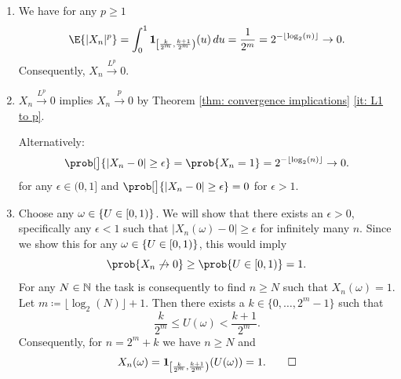 \begin{solution}
\begin{enumerate}[wide=0pt]
    \item[\ref{it: (conv in Lp but not as) in Lp}]
    We have for any \(p \ge 1\)
    \[
        \E{|X_n|^p} = \int_0^1 \ind{
            \left[\frac{k}{2^{m}}, \frac{k+1}{2^{m}} \right)
        }(u) \, du
        = \frac{1}{2^m} = 2^{-\lfloor \log_2(n) \rfloor} \to 0.
    \]
    Consequently, \(X_n \xrightarrow{L^p} 0\).

    \item[\ref{it: (conv in Lp but not as) in prob}]
    \(X_n \xrightarrow{L^p} 0\) implies \(X_n \xrightarrow{p} 0\) by Theorem
    \ref{thm: convergence implications} \ref{it: L1 to p}.

    Alternatively:
    \[
        \prob[\bigl]{|X_n - 0| \ge \epsilon}
        = \prob{X_n = 1}
        = 2^{-\lfloor \log_2(n) \rfloor} \to 0.
    \]
    for any \(\epsilon \in (0,1]\) and \(\prob[\bigl]{|X_n - 0| \ge
    \epsilon}=0\) for \(\epsilon > 1\).

    \item[\ref{it: (conv in Lp but not as) not as}]
    Choose any \(\omega \in \{U\in [0,1)\}\). We will show that there exists an
    \(\epsilon > 0\), specifically any \(\epsilon < 1\) such that
    \(|X_n(\omega) - 0| \ge \epsilon\) for infinitely many \(n\).
    Since we show this for any \(\omega\in \{U\in [0,1)\}\), this would imply
    \[
        \prob{X_n \not\to 0} \ge \prob{U \in [0,1)} = 1.
    \]
    For any \(N\in \mathbb{N}\) the task is consequently to find \(n\ge N\)
    such that \(X_n(\omega) = 1\). Let \(m \coloneq \lfloor \log_2(N) \rfloor + 1\).
    Then there exists a \(k \in \{0, \ldots, 2^m-1\}\) such that
    \[
        \frac{k}{2^m} \le U(\omega) < \frac{k+1}{2^m}.
    \]
    Consequently, for \(n = 2^m + k\) we have \(n \ge N\) and
    \[
        X_n(\omega) = \ind{\left[
            \frac{k}{2^{m}}, \frac{k+1}{2^{m}}
        \right)}(U(\omega)) = 1.
        \qedhere
    \]
\end{enumerate}
\end{solution}
